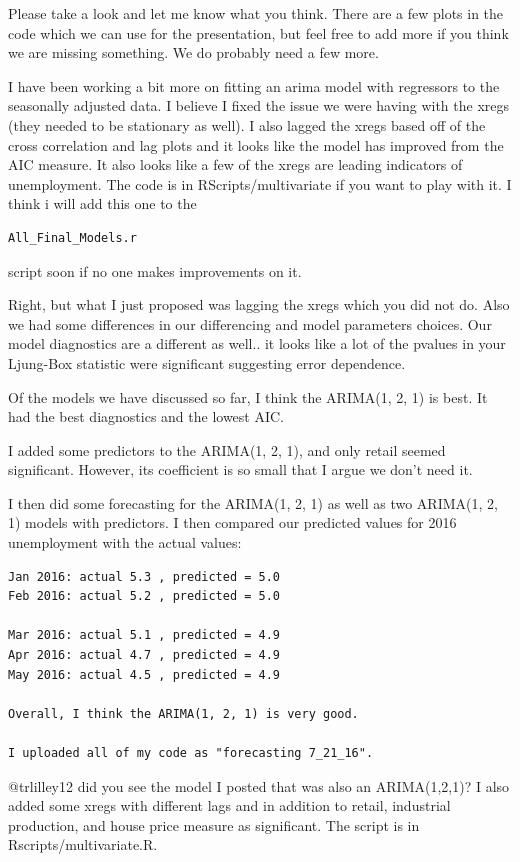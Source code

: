 \documentclass[twoside,twocolumn]{article}
\begin{document}
Please take a look and let me know what you think. There are a few plots in the code which we can use for the presentation, but feel free to add more if you think we are missing something. We do probably need a few more.

I have been working a bit more on fitting an arima model with regressors to the seasonally adjusted data. I believe I fixed the issue we were having with the xregs (they needed to be stationary as well). I also lagged the xregs based off of the cross correlation and lag plots and it looks like the model has improved from the AIC measure. It also looks like a few of the xregs are leading indicators of unemployment. The code is in RScripts/multivariate if you want to play with it. I think i will add this one to the \begin{verbatim}All_Final_Models.r\end{verbatim} script soon if no one makes improvements on it. 

Right, but what I just proposed was lagging the xregs which you did not do. Also we had some differences in our differencing and model parameters choices. Our model diagnostics are a different as well.. it looks like a lot of the pvalues in your Ljung-Box statistic were significant suggesting error dependence.

Of the models we have discussed so far, I think the ARIMA(1, 2, 1) is best. It had the best diagnostics and the lowest AIC.

I added some predictors to the ARIMA(1, 2, 1), and only retail seemed significant. However, its coefficient is so small that I argue we don't need it.

I then did some forecasting for the ARIMA(1, 2, 1) as well as two ARIMA(1, 2, 1) models with predictors. I then compared our predicted values for 2016 unemployment with the actual values:

\begin{verbatim}
Jan 2016: actual 5.3 , predicted = 5.0
Feb 2016: actual 5.2 , predicted = 5.0

Mar 2016: actual 5.1 , predicted = 4.9
Apr 2016: actual 4.7 , predicted = 4.9
May 2016: actual 4.5 , predicted = 4.9

Overall, I think the ARIMA(1, 2, 1) is very good.

I uploaded all of my code as "forecasting 7_21_16".

\end{verbatim}

@trlilley12 did you see the model I posted that was also an ARIMA(1,2,1)? I also added some xregs with different lags and in addition to retail, industrial production, and house price measure as significant. The script is in Rscripts/multivariate.R. 
\end{document}
